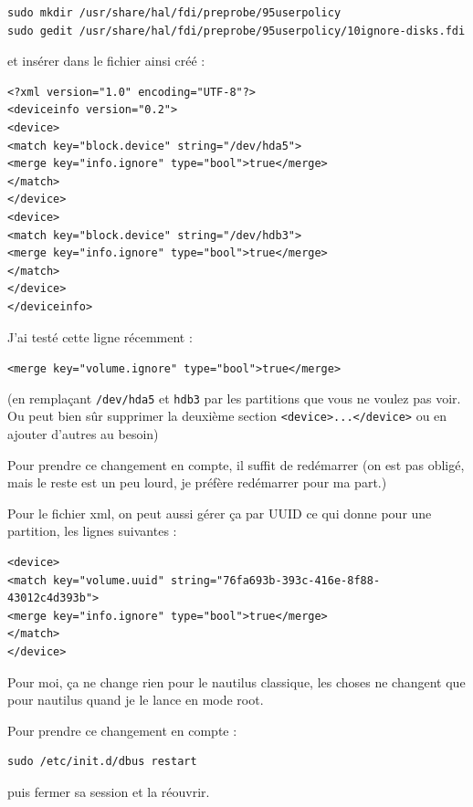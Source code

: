 \documentclass[a4paper,twoside]{article}
\begin{document}
\begin{verbatim}
sudo mkdir /usr/share/hal/fdi/preprobe/95userpolicy
sudo gedit /usr/share/hal/fdi/preprobe/95userpolicy/10ignore-disks.fdi
\end{verbatim}

et insérer dans le fichier ainsi créé :

\begin{verbatim}
<?xml version="1.0" encoding="UTF-8"?>
<deviceinfo version="0.2">
<device>
<match key="block.device" string="/dev/hda5">
<merge key="info.ignore" type="bool">true</merge>
</match>
</device>
<device>
<match key="block.device" string="/dev/hdb3">
<merge key="info.ignore" type="bool">true</merge>
</match>
</device>
</deviceinfo>
\end{verbatim}

\begin{remarque}
J'ai testé cette ligne récemment :

\texttt{<merge key="volume.ignore" type="bool">true</merge>}
\end{remarque}

(en remplaçant \texttt{/dev/hda5} et \texttt{hdb3} par les partitions que vous ne voulez pas voir. Ou peut bien sûr supprimer la deuxième section \texttt{<device>...</device>} ou en ajouter d'autres au besoin)

Pour prendre ce changement en compte, il suffit de redémarrer (on est pas obligé, mais le reste est un peu lourd, je préfère redémarrer pour ma part.)

Pour le fichier xml, on peut aussi gérer ça par UUID ce qui donne pour une partition, les lignes suivantes :
\begin{verbatim}
<device>
<match key="volume.uuid" string="76fa693b-393c-416e-8f88-43012c4d393b">
<merge key="info.ignore" type="bool">true</merge>
</match>
</device>
\end{verbatim}

\begin{remarque}
Pour moi, ça ne change rien pour le nautilus classique, les choses ne changent que pour nautilus quand je le lance en mode root.
\end{remarque}

Pour prendre ce changement en compte :

\begin{verbatim}
sudo /etc/init.d/dbus restart
\end{verbatim}

puis fermer sa session et la réouvrir.
\end{document}
